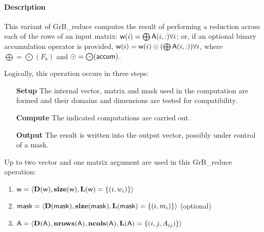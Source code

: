\paragraph{Description}

This variant of {\sf GrB\_reduce} computes the result of performing a reduction 
across each of the rows of an input matrix: ${\sf w}(i) = \bigoplus {\sf A}(i,:) \forall i$; 
or, if an optional binary accumulation operator is provided, 
${\sf w}(i) = {\sf w}(i) \odot (\bigoplus {\sf A}(i,:)) \forall i$, 
where $\bigoplus = \bigodot({F_b})$ and $\odot = \bigodot({\sf accum})$.

Logically, this operation occurs in three steps:
\begin{enumerate}[leftmargin=0.75in]
\item[\bf Setup] The internal vector, matrix and mask used in the computation are formed 
and their domains and dimensions are tested for compatibility.
\item[\bf Compute] The indicated computations are carried out.
\item[\bf Output] The result is written into the output vector, possibly under 
control of a mask.
\end{enumerate}

Up to two vector and one matrix argument are used in this {\sf GrB\_reduce} operation:
\begin{enumerate}
	\item ${\sf w} = \langle \bold{D}({\sf w}),\bold{size}({\sf w}),
    \bold{L}({\sf w}) = \{(i,w_i) \} \rangle$

	\item ${\sf mask} = \langle \bold{D}({\sf mask}),\bold{size}({\sf mask}),
    \bold{L}({\sf mask}) = \{(i,m_i) \} \rangle$ (optional)

	\item ${\sf A} = \langle \bold{D}({\sf A}),\bold{nrows}({\sf A}),
    \bold{ncols}({\sf A}),\bold{L}({\sf A}) = \{(i,j,A_{ij}) \} \rangle$
\end{enumerate}

